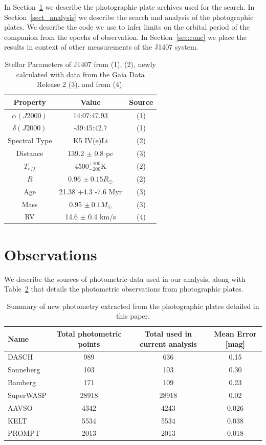 \documentclass[twocolumn]{aa}
\begin{document}
In Section~\ref{sec:obs} we describe the photographic plate archives used for the search.
%
In Section~\ref{sect_analysis} we describe the search and analysis of the photographic plates.
%
We describe the code we use to infer limits on the orbital period of the companion from the epochs of observation.
%
In Section~\ref{sec:conc} we place the results in context of other measurements of the J1407 system.

\begin{table}
\centering
\begin{tabular}{ccc}
\hline
Property & Value & Source \\ 
\hline
$\alpha(J2000)$ & 14:07:47.93 & (1) \\
$\delta(J2000)$ & -39:45:42.7 & (1) \\
Spectral Type & K5 IV(e)Li & (2) \\
Distance & 139.2 $\pm$ 0.8 pc & (3) \\
$T_{eff}$ & $4500^{+100}_{-200}$K & (2) \\
$R$ & 0.96 $\pm\ 0.15R_\odot$ & (2) \\
Age & 21.38 +4.3 -7.6 Myr & (3) \\
Mass & 0.95 $\pm\ 0.1 M_\odot$ & (3)\\
RV & 14.6 $\pm$ 0.4 km/s & (4)\\
\hline
\end{tabular}
\label{tab:stellar_params}
\caption{Stellar Parameters of J1407 from \citep{Zacharias10} (1), \citep{Mamajek12} (2), newly calculated with data from the Gaia Data Release 2 (3), and from \citet{Kenworthy15} (4).}
\end{table}

\section{Observations}\label{sec:obs}

We describe the sources of photometric data used in our analysis, along with Table~\ref{tab:photographs} that details the photometric observations from photographic plates.

\begin{table}[t]
\centering
\caption{Summary of new photometry extracted from the photographic plates detailed in this paper.}
\label{tab:photographs}
\begin{tabular}{lccc}
\hline
Name  & Total photometric points & Total used in current analysis  & Mean Error [mag] \\
\hline
DASCH & 989 & 636 & 0.15 \\
Sonneberg & 103 & 103 & 0.30 \\
Bamberg & 171 & 109 & 0.23 \\
SuperWASP & 28918 & 28918 & 0.02 \\
AAVSO & 4342 & 4243 & 0.026 \\
KELT & 5534 & 5534 & 0.038 \\
PROMPT & 2013 & 2013 & 0.018 \\
\hline
\end{tabular}

\end{table}
\end{document}
